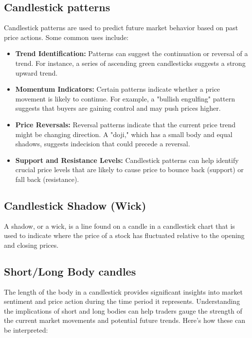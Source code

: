 \documentclass{report}
\begin{document}
     \pagebreak 
     \subsection{Candlestick patterns}
     \bigbreak \noindent 
     Candlestick patterns are used to predict future market behavior based on past price actions. Some common uses include:
     \bigbreak \noindent 
     \begin{itemize}
         \item \textbf{Trend Identification:} Patterns can suggest the continuation or reversal of a trend. For instance, a series of ascending green candlesticks suggests a strong upward trend.
         \item \textbf{Momentum Indicators:} Certain patterns indicate whether a price movement is likely to continue. For example, a "bullish engulfing" pattern suggests that buyers are gaining control and may push prices higher.
         \item \textbf{Price Reversals:} Reversal patterns indicate that the current price trend might be changing direction. A "doji," which has a small body and equal shadows, suggests indecision that could precede a reversal.
         \item \textbf{Support and Resistance Levels:} Candlestick patterns can help identify crucial price levels that are likely to cause price to bounce back (support) or fall back (resistance).
     \end{itemize}

     \bigbreak \noindent 
     \subsection{Candlestick Shadow (Wick)}
     \bigbreak \noindent 
     A shadow, or a wick, is a line found on a candle in a candlestick chart that is used to indicate where the price of a stock has fluctuated relative to the opening and closing prices.
     \bigbreak \noindent 
     \bigbreak \noindent 

     \bigbreak \noindent 
     \subsection{Short/Long Body candles}
     \bigbreak \noindent 
     The length of the body in a candlestick provides significant insights into market sentiment and price action during the time period it represents. Understanding the implications of short and long bodies can help traders gauge the strength of the current market movements and potential future trends. Here’s how these can be interpreted:
     \bigbreak \noindent 
\end{document}
